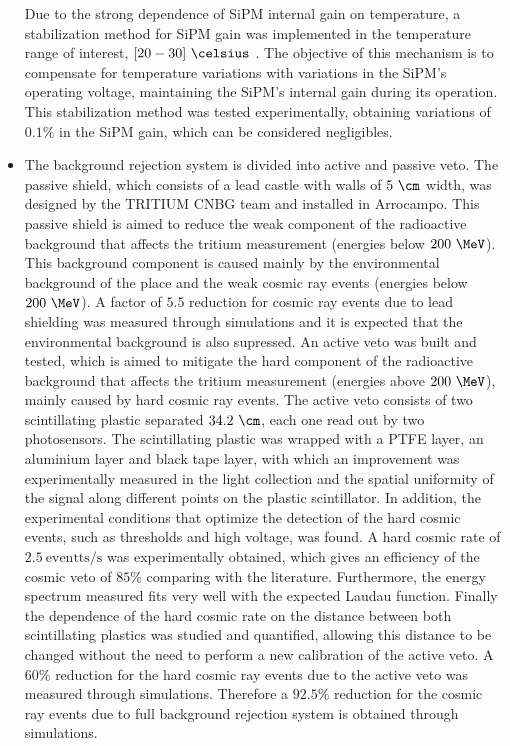 \begin{itemize}

Due to the strong dependence of SiPM internal gain on temperature, a stabilization method for SiPM gain was implemented in the temperature range of interest, $[20-30]~\celsius$ . The objective of this mechanism is to compensate for temperature variations with variations in the SiPM's operating voltage, maintaining the SiPM's internal gain during its operation. This stabilization method was tested experimentally, obtaining variations of $0.1\%$ in the SiPM gain, which can be considered negligibles.

\item{} The background rejection system is divided into active and passive veto. The passive shield, which consists of a lead castle with walls of $5~\cm$ width, was designed by the TRITIUM CNBG team and installed in Arrocampo. This passive shield is aimed to reduce the weak component of the radioactive background that affects the tritium measurement (energies below $200~\MeV$). This background component is caused mainly by the environmental background of the place and the weak cosmic ray events (energies below $200~\MeV$). A factor of $5.5$ reduction for cosmic ray events due to lead shielding was measured through simulations and it is expected that the environmental background is also supressed. An active veto was built and tested, which is aimed to mitigate the hard component of the radioactive background that affects the tritium measurement (energies above $200~\MeV$), mainly caused by hard cosmic ray events. The active veto consists of two scintillating plastic separated $34.2~\cm$, each one read out by two photosensors. The scintillating plastic was wrapped with a PTFE layer, an aluminium layer and black tape layer, with which an improvement was experimentally measured in the light collection and the spatial uniformity of the signal along different points on the plastic scintillator. In addition, the experimental conditions that optimize the detection of the hard cosmic events, such as thresholds and high voltage, was found. A hard cosmic rate of $2.5~\text{eventts}/\text{s}$ was experimentally obtained, which gives an efficiency of the cosmic veto of $85\%$ comparing with the literature. Furthermore, the energy spectrum measured fits very well with the expected Laudau function. Finally the dependence of the hard cosmic rate on the distance between both scintillating plastics was studied and quantified, allowing this distance to be changed without the need to perform a new calibration of the active veto. A $60\%$ reduction for the hard cosmic ray events due to the active veto was measured through simulations. Therefore a $92.5\%$ reduction for the cosmic ray events due to full background rejection system is obtained through simulations.


\end{itemize}

